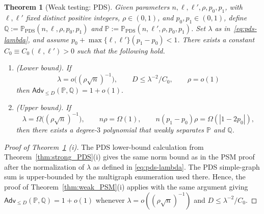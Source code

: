 \documentclass[11pt, letterpaper]{article}
\newtheorem{theorem}{Theorem}[section]
\numberwithin{equation}{section}
\newcommand{\Adv}{\mathsf{Adv}}
\newcommand{\PP}{\mathbb{P}}
\newcommand{\QQ}{\mathbb{Q}}
\begin{document}
\begin{theorem}[Weak testing: PDS]\label{thm:Weak_PDS}
Given parameters $n,\ell,\ell',\rho,p_0,p_1$, with 
$\ell,\ell'$ fixed distinct positive integers, $\rho\in(0,1)$, and
$p_0,p_1\in(0,1)$, define
$\QQ:=\mathbb{P}_{\mathrm{PDS}}(n,\ell,\rho,p_0,p_1)$ and
$\PP:=\mathbb{P}_{\mathrm{PDS}}(n,\ell',\rho,p_0,p_1)$.
Set $\lambda$ as in~\eqref{eq:pds-lambda}, and assume
$p_0+\max\{\ell,\ell'\}(p_1-p_0)<1$. There exists a constant $C_0\equiv C_0(\ell,\ell')>0$ such that the following hold.
\begin{enumerate}
  \item[(i)] \emph{(Lower bound)}.
 If
  $$\lambda = o \Big(({\rho}\sqrt{n})^{-1}\Big), \qquad D\leq \lambda^{-2}/C_0, \qquad \rho=o(1)$$ 
  then $\Adv_{\leq D}(\PP,\QQ)=1+o(1).$\\  
  \item[(ii)] \emph{(Upper bound)}.  If
  $$ \lambda=\Omega\Big(({\rho}\sqrt{n})^{-1}\Big), \qquad n\rho = \Omega(1),  \qquad n(p_1-p_0)\rho = \Omega\left(|1-2p_0|\right),
  $$
  then there exists a degree-$3$ polynomial that weakly separates $\PP$ and $\QQ$.
\end{enumerate}
\end{theorem}
\begin{proof}[Proof of Theorem~\ref{thm:Weak_PDS} \textnormal{(i)}]
The PDS lower-bound calculation from Theorem~\ref{thm:strong_PDS}\textnormal{(i)} gives the same norm bound as in the PSM proof after the normalization of $\lambda$ as defined in \eqref{eq:pds-lambda}. The PDS simple-graph sum is upper-bounded by the multigraph enumeration used there. Hence, the proof of Theorem~\ref{thm:weak_PSM}\textnormal{(i)} applies with the same argument giving $\Adv_{\le D}(\PP,\QQ)=1+o(1)$
whenever $\lambda=o((\rho\sqrt n)^{-1})$ and $D\le \lambda^{-2}/C_0$.
\end{proof}
\end{document}

